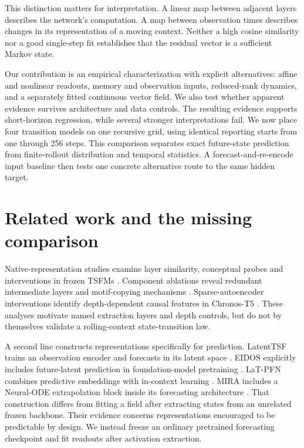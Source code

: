 \documentclass[10pt,a4paper,twocolumn]{article}
\begin{document}
This distinction matters for interpretation.
A linear map between adjacent layers describes the network's computation.
A map between observation times describes changes in its representation of a moving context.
Neither a high cosine similarity nor a good single-step fit establishes that the residual vector is a sufficient Markov state.

Our contribution is an empirical characterization with explicit alternatives:
affine and nonlinear readouts, memory and observation inputs, reduced-rank dynamics, and a separately fitted continuous vector field.
We also test whether apparent evidence survives architecture and data controls.
The resulting evidence supports short-horizon regression, while several stronger interpretations fail.
We now place four transition models on one recursive grid, using identical reporting starts from one through 256 steps.
This comparison separates exact future-state prediction from finite-rollout distribution and temporal statistics.
A forecast-and-re-encode input baseline then tests one concrete alternative route to the same hidden target.

\section{Related work and the missing comparison}
Native-representation studies examine layer similarity, conceptual probes and interventions in frozen TSFMs \citep{wilinski,pandey}.
Component ablations reveal redundant intermediate layers and motif-copying mechanisms \citep{bao}.
Sparse-autoencoder interventions identify depth-dependent causal features in Chronos-T5 \citep{mishra}.
These analyses motivate named extraction layers and depth controls, but do not by themselves validate a rolling-context state-transition law.

A second line constructs representations specifically for prediction.
LatentTSF trains an observation encoder and forecasts in its latent space \citep{yang}.
EIDOS explicitly includes future-latent prediction in foundation-model pretraining \citep{eidos}.
LaT-PFN combines predictive embeddings with in-context learning \citep{latpfn}.
MIRA includes a Neural-ODE extrapolation block inside its forecasting architecture \citep{mira}.
That construction differs from fitting a field after extracting states from an unrelated frozen backbone.
Their evidence concerns representations encouraged to be predictable by design.
We instead freeze an ordinary pretrained forecasting checkpoint and fit readouts after activation extraction.
\end{document}
